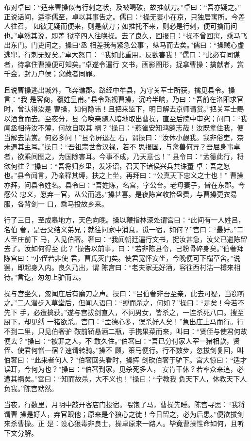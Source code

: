 布对卓曰：“适来曹操似有行刺之状，及被喝破，故推献刀。”卓曰：“吾亦疑之。”
正说话间，适李儒至，卓以其事告之。儒曰：“操无妻小在京，只独居寓所。今差人往召，
如彼无疑而便来，则是献刀；如推托不来，则必是行刺，便可擒而问也。”卓然其说，即差
狱卒四人往唤操。去了良久，回报曰：“操不曾回寓，乘马飞出东门。门吏问之，操曰‘丞
相差我有紧急公事’，纵马而去矣。”儒曰：“操贼心虚逃窜，行刺无疑矣。”卓大怒曰：
“我如此重用，反欲害我！”儒曰：“此必有同谋者，待拿住曹操便可知矣。”卓遂令遍行
文书，画影图形，捉拿曹操：擒献者，赏千金，封万户侯；窝藏者同罪。

且说曹操逃出城外，飞奔谯郡。路经中牟县，为守关军士所获，擒见县令。操言：“我
是客商，覆姓皇甫。”县令熟视曹操，沉吟半晌，乃曰：“吾前在洛阳求官时，曾认得汝是
曹操，如何隐讳！且把来监下，明日解去京师请赏。”把关军士赐以酒食而去。至夜分，县
令唤亲随人暗地取出曹操，直至后院中审究；问曰：“我闻丞相待汝不薄，何故自取其
祸？”操曰：“燕雀安知鸿鹄志哉！汝既拿住我，便当解去请赏。何必多问！”县令屏退左
右，谓操曰：“汝休小觑我。我非俗吏，奈未遇其主耳。”操曰：“吾祖宗世食汉禄，若不
思报国，与禽兽何异？吾屈身事卓者，欲乘间图之，为国除害耳。今事不成，乃天意也！”
县令曰：“孟德此行，将欲何往？”操曰：“吾将归乡里，发矫诏，召天下诸侯兴兵共诛董
卓：吾之愿也。”县令闻言，乃亲释其缚，扶之上坐，再拜曰：“公真天下忠义之士也！”
曹操亦拜，问县令姓名。县令曰：“吾姓陈，名宫，字公台。老母妻子，皆在东郡。今感公
忠义，愿弃一官，从公而逃。”操甚喜。是夜陈宫收拾盘费，与曹操更衣易服，各背剑一
口，乘马投故乡来。

行了三日，至成皋地方，天色向晚。操以鞭指林深处谓宫曰：“此间有一人姓吕，名伯
奢，是吾父结义弟兄；就往问家中消息，觅一宿，如何？”宫曰：“最好。”二人至庄前下
马，入见伯奢。奢曰：“我闻朝廷遍行文书，捉汝甚急，汝父已避陈留去了。汝如何得至
此？”操告以前事，曰：“若非陈县令，已粉骨碎身矣。”伯奢拜陈宫曰：“小侄若非使
君，曹氏灭门矣。使君宽怀安坐，今晚便可下榻草舍。”说罢，即起身入内。良久乃出，谓
陈宫曰：“老夫家无好酒，容往西村沽一樽来相待。”言讫，匆匆上驴而去。

操与宫坐久，忽闻庄后有磨刀之声。操曰：“吕伯奢非吾至亲，此去可疑，当窃听
之。”二人潜步入草堂后，但闻人语曰：“缚而杀之，何如？”操曰：“是矣！今若不先下
手，必遭擒获。”遂与宫拔剑直入，不问男女，皆杀之，一连杀死八口。搜至厨下，却见缚
一猪欲杀。宫曰：“孟德心多，误杀好人矣！”急出庄上马而行。行不到二里，只见伯奢驴
鞍前鞒悬酒二瓶，手携果菜而来，叫曰：“贤侄与使君何故便去？”操曰：“被罪之人，不
敢久住。”伯奢曰：“吾已分付家人宰一猪相款，贤侄、使君何憎一宿？速请转骑。”操不
顾，策马便行。行不数步，忽拔剑复回，叫伯奢曰：“此来者何人？”伯奢回头看时，操挥
剑砍伯奢于驴下。宫大惊曰：“适才误耳，今何为也？”操曰：“伯奢到家，见杀死多人，
安肯干休？若率众来追，必遭其祸矣。”宫曰：“知而故杀，大不义也！”操曰：“宁教我
负天下人，休教天下人负我。”陈宫默然。

当夜，行数里，月明中敲开客店门投宿。喂饱了马，曹操先睡。陈宫寻思：“我将谓曹
操是好人，弃官跟他；原来是个狼心之徒！今日留之，必为后患。”便欲拔剑来杀曹操。正
是：设心狠毒非良士，操卓原来一路人。毕竟曹操性命如何，且听下文分解。